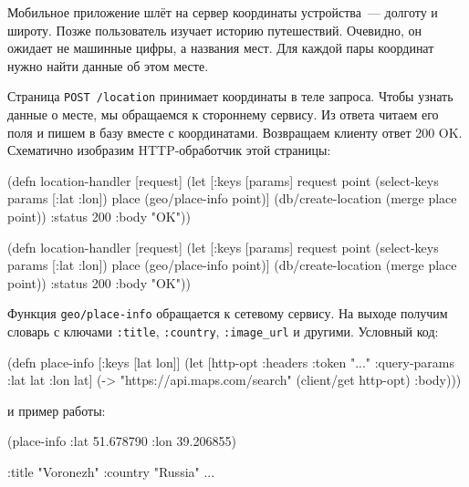 Мобильное приложение шлёт на сервер координаты устройства~--- долготу и
широту. Позже пользователь изучает историю путешествий. Очевидно, он ожидает не
машинные цифры, а названия мест. Для каждой пары координат нужно найти данные об
этом месте.

Страница \verb|POST /location| принимает координаты в теле запроса. Чтобы узнать
данные о месте, мы обращаемся к стороннему сервису. Из ответа читаем его поля и
пишем в базу вместе с координатами. Возвращаем клиенту ответ 200 OK. Схематично
изобразим HTTP-обработчик этой страницы:

\ifnarrow

\begin{english}
  \begin{clojure}
(defn location-handler [request]
  (let [{:keys [params]} request
        point (select-keys params
                [:lat :lon])
        place (geo/place-info point)]
    (db/create-location
      (merge place point))
    {:status 200 :body "OK"}))
  \end{clojure}
\end{english}

\else

\begin{english}
  \begin{clojure}
(defn location-handler [request]
  (let [{:keys [params]} request
        point (select-keys params [:lat :lon])
        place (geo/place-info point)]
    (db/create-location (merge place point))
    {:status 200 :body "OK"}))
  \end{clojure}
\end{english}

\fi

Функция \verb|geo/place-info| обращается к сетевому сервису. На выходе получим
словарь с ключами \verb|:title|, \verb|:country|, \verb|:image_url| и
другими. Условный код:

\begin{english}
  \begin{clojure}
(defn place-info
  [{:keys [lat lon]}]
  (let [http-opt
        {:headers {:token "..."}
         :query-params {:lat lat
                        :lon lat}}]
    (-> "https://api.maps.com/search"
        (client/get http-opt)
        :body)))
  \end{clojure}
\end{english}

\noindent
и пример работы:

\begin{english}
  \begin{clojure}
(place-info {:lat 51.678790
             :lon 39.206855})

{:title "Voronezh"
 :country "Russia"
 ...}
  \end{clojure}
\end{english}


